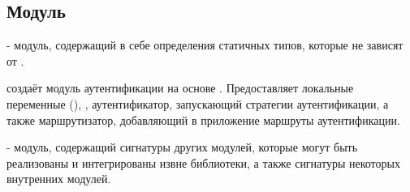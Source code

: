 \subsection{Модуль }\label{page-FPauth-module-FPauth}%
\label{page-FPauth-module-FPauth-module-Static}\begin{ocamlindent} - модуль, содержащий в себе определения статичных типов, которые не зависят от \hyperref[page-FPauth-core-module-FPauth+u+core-module-Auth+u+sign-module-type-MODEL]{}.\end{ocamlindent}%
\medbreak
\label{page-FPauth-module-FPauth-module-Make+u+Auth}\begin{ocamlindent} создаёт модуль аутентификации на основе \hyperref[page-FPauth-core-module-FPauth+u+core-module-Auth+u+sign-module-type-MODEL]{}. Предоставляет локальные переменные (), , аутентификатор, запускающий стратегии аутентификации, а также маршрутизатор, добавляющий в приложение маршруты аутентификации.\end{ocamlindent}%
\medbreak
\label{page-FPauth-module-FPauth-module-Auth+u+sign}\begin{ocamlindent} - модуль, содержащий сигнатуры других модулей, которые могут быть реализованы и интегрированы извне библиотеки, а также сигнатуры некоторых внутренних модулей.\end{ocamlindent}%
